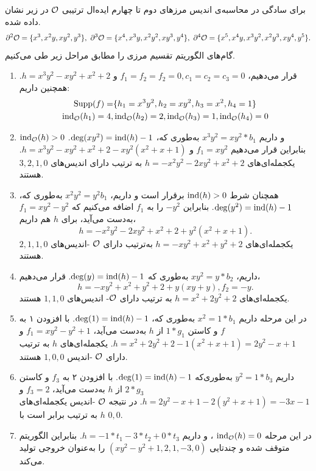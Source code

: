 \begin{example}
برای سادگی در محاسبه‌ی اندیس مرزهای دوم تا چهارم ایده‌ال ترتیبی 
${\mathcal O}$
در زیر نشان داده شده.
$$\pok{2} = \{x^{3}, x^{2}y, xy^{2}, y^{3}\}, \ \pok{3} = \{x^{4}, x^{3}y, x^{2}y^{2}, xy^{3}, y^{4}\}, \ \pok{4} = \{x^{5}, x^{4}y, x^{3}y^{2}, x^{2}y^{3}, xy^{4}, y^{5}\}.$$
گام‌های الگوریتم تقسیم مرزی را مطابق مراحل زیر طی می‌کنیم.
\begin{enumerate}
\item
قرار می‌دهیم، 
$f_{1} = f_{2} = f_{2} = 0, c_{1} = c_{2} = c_{3} = 0$
و 
$h = x^{3}y^{2} - xy^{2} + x^{2} + 2$.
همچنین داریم:
\begin{align*}
\operatorname{\mathrm{Supp}}(f) =& \{h_{1} = x^{3}y^{2}, h_{2} = xy^{2}, h_{3} = x^{2}, h_{4} = 1\}\\ \operatorname{\mathrm{ind}}_{{\mathcal O}}(h_{1}) = 4,& \operatorname{\mathrm{ind}}_{{\mathcal O}}(h_{2}) = 2, \operatorname{\mathrm{ind}}_{{\mathcal O}}(h_{3}) = 1, \operatorname{\mathrm{ind}}_{{\mathcal O}}(h_{4}) = 0
\end{align*}
\item
$\operatorname{\mathrm{ind}}_{{\mathcal O}}(h)>0$
و داریم
$x^{3}y^{2} = xy^{2}*b_{1}$
به‌طوری که،
$\deg(xy^{2}) = \operatorname{\mathrm{ind}}(h) - 1$.
بنابراین قرار می‌دهیم 
$f_{1} = xy^{2}$
و
$h = x^{3}y^{2} - xy^{2} + x^{2} + 2 - xy^{2}(x^{2} + x + 1)$.
یکجمله‌ای‌های  
$h = -x^{2}y^{2} - 2xy^{2} + x^{2} + 2$
به ترتیب دارای اندیس‌های 
$3,2,1,0$
هستند. 
\item
همچنان شرط 
$\operatorname{\mathrm{ind}}(h)>0$
برقرار است و داریم، 
$x^{2}y^{2} = y^{2}b_{1}$
به‌طوری که،
$\deg(y^{2}) = \operatorname{\mathrm{ind}}(h) - 1$.
بنابراین 
$-y^{2}$
را به 
$f_{1}$
اضافه می‌کنیم که 
$f_{1} = xy^{2} - y^{2}$
به‌دست  می‌آید، برای 
$h$
هم داریم، 
$$h = -x^{2}y^{2} - 2xy^{2} + x^{2} +2 +y^{2}(x^{2} + x+ 1).$$
یکجمله‌ای‌های 
$h = -xy^{2} + x^{2} + y^{2} + 2$
به‌ترتیب دارای 
${\mathcal O}$
-اندیس‌های
$2,1,1,0$
هستند. 
\item
داریم، 
$xy^{2} = y*b_{2}$
به‌طوری که 
$\deg(y) = \operatorname{\mathrm{ind}}(h) - 1$.
قرار می‌دهیم، 
$$h = -xy^{2} + x^{2} + y^{2} + 2 + y(xy + y), f_{2} = -y.$$
یکجمله‌ای‌های 
$h = x^{2} + 2y^{2} + 2$
به ترتیب دارای 
${\mathcal O}$-
اندیس‌های
$1,1,0$
هستند.
\item
در این مرحله داریم 
$x^{2} = 1*b_{1}$
به‌طوری که، 
$\deg(1) = \operatorname{\mathrm{ind}}(h) - 1$.
با افزودن ۱ به 
$f$
و کاستن 
$1*g_{1}$
از 
$h$
به‌دست  می‌آید، 
$f_{1} = xy^{2} - y^{2} + 1$
و
$h = x^{2} + 2y^{2} + 2 -1(x^{2} + x + 1) = 2y^{2} - x + 1$.
یکجمله‌ای‌های 
$h$
به‌ ترتیب دارای 
${\mathcal O}$
-اندیس 
$1,0,0$
هستند. 
\item
داریم 
$y^{2} = 1*b_{3}$
به‌طوری‌که 
$\deg(1) = \operatorname{\mathrm{ind}}(h) - 1$.
با افزودن ۲ به 
$f_{3}$
و کاستن 
$2*g_{3}$
از 
$h$
به‌دست  می‌آید، 
$f_{3} = 2$
و
$h = 2y^{2} - x + 1 - 2(y^{2} + x + 1) = -3x - 1$.
در نتیجه 
${\mathcal O}$
-اندیس  یکجمله‌ای‌های 
$h$
به ترتیب برابر است با 
$0,0$.
\item
در این مرحله 
$\operatorname{\mathrm{ind}}_{{\mathcal O}}(h) = 0$
، و داریم 
$h = -1*t_{1} -3*t_{2} + 0*t_{3}$.
بنابراین الگوریتم متوقف شده و چندتایی 
$(xy^{2} - y^{2} + 1, 2, 1, -3, 0)$
را  به‌عنوان خروجی تولید می‌کند.


\end{enumerate}
\end{example}
